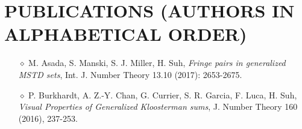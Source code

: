 \documentclass{simplecv}
\begin{document}
\section{PUBLICATIONS (AUTHORS IN ALPHABETICAL ORDER)}
\begin{itemize}
  \itemsep0em
  \item[$\diamond$] M. Asada, S. Manski, S. J. Miller, H. Suh, \emph{Fringe pairs in generalized MSTD sets}, Int. J. Number Theory 13.10 (2017): 2653-2675. %
  \item[$\diamond$] P. Burkhardt, A. Z.-Y. Chan, G. Currier, S. R. Garcia, F. Luca, H. Suh, \emph{Visual Properties of Generalized Kloosterman sums}, J. Number Theory 160 (2016), 237-253. %
\end{itemize}


\end{document}
